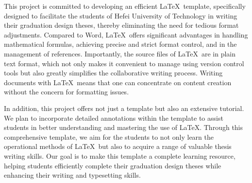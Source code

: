 \newcommand{\keywordsCn}[1][\LaTeX 模版；合肥工业大学；教程]{#1}
\begin{abstract}
    本项目致力于开发一个高效的 \LaTeX 模板，旨在为合肥工业大学的同学们撰写毕业设计论文提供便利，从而免去繁琐的格式调整工作。相比于 Word，\LaTeX 在处理数学公式、实现精确严格的格式控制，以及管理参考文献方面展现出显著优势。重要的是，\LaTeX 的源文件为纯文本格式，这不仅方便使用版本控制工具进行管理，还极大地简化了协作写作过程。采用 \LaTeX 编写文档意味着可以将注意力集中在内容创作上，而无需担心格式问题。
    
    此外，本项目不仅提供一个模板，还包括一个全面的教程。我们将在模板中加入详尽的注释，以辅助同学们更好地理解和掌握 \LaTeX 的使用技巧。我们希望通过这个综合性的模板，同学们不仅能够学习到 \LaTeX 的操作方法，还能掌握一系列有价值的论文写作技巧。我们的目标是让这个模板成为一个完善的学习资源，帮助同学们高效地完成他们的毕业设计论文，同时提升写作和排版能力。
\end{abstract}

\newcommand{\keywordsEn}[1][\LaTeX\ Template, HFUT, Tutorial]{#1}
\begin{abstractEn}
    This project is committed to developing an efficient \LaTeX\ template, specifically designed to facilitate the students of Hefei University of Technology in writing their graduation design theses, thereby eliminating the need for tedious format adjustments. Compared to Word, \LaTeX\ offers significant advantages in handling mathematical formulas, achieving precise and strict format control, and in the management of references. Importantly, the source files of \LaTeX\ are in plain text format, which not only makes it convenient to manage using version control tools but also greatly simplifies the collaborative writing process. Writing documents with \LaTeX\ means that one can concentrate on content creation without the concern for formatting issues.
    
    In addition, this project offers not just a template but also an extensive tutorial. We plan to incorporate detailed annotations within the template to assist students in better understanding and mastering the use of \LaTeX. Through this comprehensive template, we aim for the students to not only learn the operational methods of \LaTeX\ but also to acquire a range of valuable thesis writing skills. Our goal is to make this template a complete learning resource, helping students efficiently complete their graduation design theses while enhancing their writing and typesetting skills.
\end{abstractEn}
